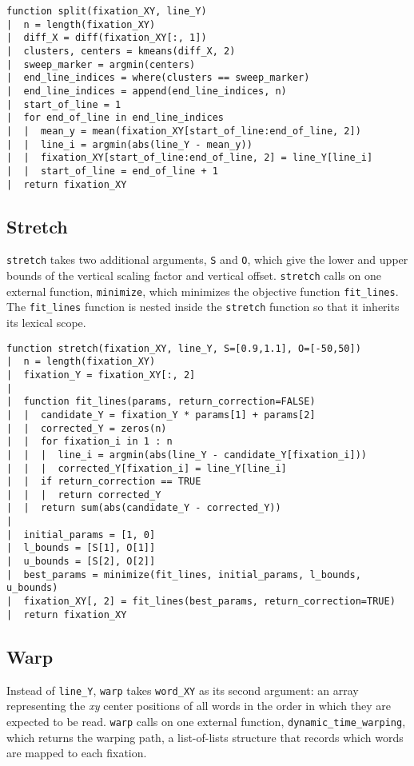 \documentclass[doc,biblatex]{apa7}
\begin{document}
\begin{verbatim}
function split(fixation_XY, line_Y)
|  n = length(fixation_XY)
|  diff_X = diff(fixation_XY[:, 1])
|  clusters, centers = kmeans(diff_X, 2)
|  sweep_marker = argmin(centers)
|  end_line_indices = where(clusters == sweep_marker)
|  end_line_indices = append(end_line_indices, n)
|  start_of_line = 1
|  for end_of_line in end_line_indices
|  |  mean_y = mean(fixation_XY[start_of_line:end_of_line, 2])
|  |  line_i = argmin(abs(line_Y - mean_y))
|  |  fixation_XY[start_of_line:end_of_line, 2] = line_Y[line_i]
|  |  start_of_line = end_of_line + 1
|  return fixation_XY
\end{verbatim}

\subsection{Stretch}

\noindent
\texttt{stretch} takes two additional arguments, \texttt{S} and \texttt{O}, which give the lower and upper bounds of the vertical scaling factor and vertical offset. \texttt{stretch} calls on one external function, \texttt{minimize}, which minimizes the objective function \texttt{fit\_lines}. The \texttt{fit\_lines} function is nested inside the \texttt{stretch} function so that it inherits its lexical scope.

\begin{verbatim}
function stretch(fixation_XY, line_Y, S=[0.9,1.1], O=[-50,50])
|  n = length(fixation_XY)
|  fixation_Y = fixation_XY[:, 2]
|
|  function fit_lines(params, return_correction=FALSE)
|  |  candidate_Y = fixation_Y * params[1] + params[2]
|  |  corrected_Y = zeros(n)
|  |  for fixation_i in 1 : n
|  |  |  line_i = argmin(abs(line_Y - candidate_Y[fixation_i]))
|  |  |  corrected_Y[fixation_i] = line_Y[line_i]
|  |  if return_correction == TRUE
|  |  |  return corrected_Y
|  |  return sum(abs(candidate_Y - corrected_Y))
|
|  initial_params = [1, 0]
|  l_bounds = [S[1], O[1]]
|  u_bounds = [S[2], O[2]]
|  best_params = minimize(fit_lines, initial_params, l_bounds, u_bounds)
|  fixation_XY[, 2] = fit_lines(best_params, return_correction=TRUE)
|  return fixation_XY
\end{verbatim}

\subsection{Warp}

\noindent
Instead of \texttt{line\_Y}, \texttt{warp} takes \texttt{word\_XY} as its second argument: an array representing the \textit{xy} center positions of all words in the order in which they are expected to be read. \texttt{warp} calls on one external function, \texttt{dynamic\_time\_warping}, which returns the warping path, a list-of-lists structure that records which words are mapped to each fixation.
\end{document}

